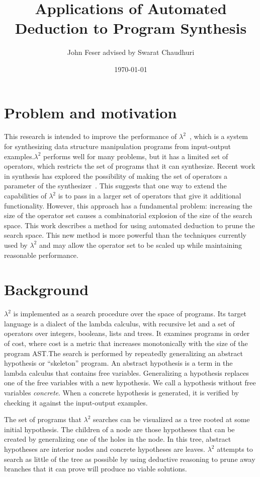 \documentclass[11pt]{article}
\author{John Feser advised by Swarat Chaudhuri}
\date{\today}
\title{Applications of Automated Deduction to Program Synthesis}
\newcommand{\sys}{$\lambda^2$\xspace}
\begin{document}
\maketitle

\section{Problem and motivation}
\label{sec-1}

This research is intended to improve the performance of
\sys~\cite{l2}, which is a system for synthesizing data structure
manipulation programs from input-output examples.\@ \sys performs well
for many problems, but it has a limited set of operators, which
restricts the set of programs that it can synthesize. Recent work in
synthesis has explored the possibility of making the set of operators
a parameter of the synthesizer~\cite{component}. This suggests that
one way to extend the capabilities of \sys is to pass in a larger set
of operators that give it additional functionality. However, this
approach has a fundamental problem: increasing the size of the
operator set causes a combinatorial explosion of the size of the
search space. This work describes a method for using automated
deduction to prune the search space. This new method is more powerful
than the techniques currently used by \sys and may allow the operator
set to be scaled up while maintaining reasonable performance.

\section{Background}
\label{sec-2}

\sys is implemented as a search procedure over the space of
programs. Its target language is a dialect of the lambda calculus,
with recursive let and a set of operators over integers, booleans,
lists and trees. It examines programs in order of cost, where cost is
a metric that increases monotonically with the size of the program
AST.\@ The search is performed by repeatedly generalizing an abstract
hypothesis or ``skeleton'' program. An abstract hypothesis is a term
in the lambda calculus that contains free variables. Generalizing a
hypothesis replaces one of the free variables with a new
hypothesis. We call a hypothesis without free variables
\emph{concrete}. When a concrete hypothesis is generated, it is
verified by checking it against the input-output examples.

The set of programs that \sys searches can be visualized as a tree
rooted at some initial hypothesis. The children of a node are those
hypotheses that can be created by generalizing one of the holes in the
node. In this tree, abstract hypotheses are interior nodes and
concrete hypotheses are leaves. \sys attempts to search as little of
the tree as possible by using deductive reasoning to prune away
branches that it can prove will produce no viable solutions.
\end{document}
